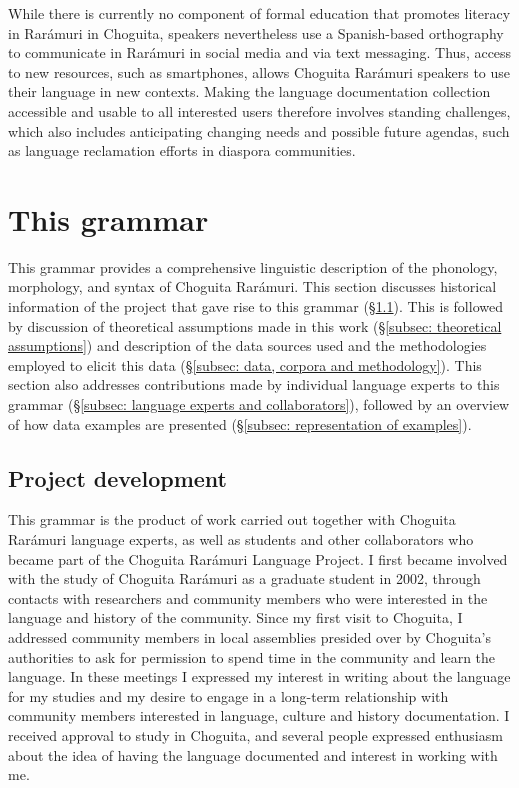 While there is currently no component of formal education that promotes literacy in Rarámuri in Choguita, speakers nevertheless use a {Spanish}-based orthography to communicate in Rarámuri in social media and via text messaging. Thus,  access to new resources, such as smartphones, allows Choguita Rarámuri speakers to use their language in new contexts. Making the language documentation collection accessible and usable to all interested users therefore involves standing challenges, which also includes anticipating changing needs and possible future agendas, such as language reclamation efforts in diaspora communities.

\section{This grammar}
\label{sec: this grammar}

This grammar provides a comprehensive linguistic description of the phonology, morphology, and syntax of Choguita Rarámuri. This section discusses historical information of the project that gave rise to this grammar (§\ref{subsec: project development}). This is followed by discussion of theoretical assumptions made in this work (§\ref{subsec: theoretical assumptions}) and description of the data sources used and the methodologies employed to elicit this data (§\ref{subsec: data, corpora and methodology}). This section also addresses contributions made by individual language experts to this grammar (§\ref{subsec: language experts and collaborators}), followed by an overview of how data examples are presented (§\ref{subsec: representation of examples}).

\subsection{Project development}
\label{subsec: project development}

This grammar is the product of work carried out together with Choguita Rarámuri language experts, as well as students and other collaborators who became part of the Choguita Rarámuri Language Project. I first became involved with the study of Choguita Rarámuri as a graduate student in 2002, through contacts with researchers and community members who were interested in the language and history of the community. Since my first visit to Choguita, I addressed community members in local assemblies presided over by Choguita's authorities to ask for permission to spend time in the community and learn the language. In these meetings I expressed my interest in writing about the language for my studies and my desire to engage in a long-term relationship with community members interested in language, culture and history documentation. I received approval to study in Choguita, and several people expressed enthusiasm about the idea of having the language documented and interest in working with me.

